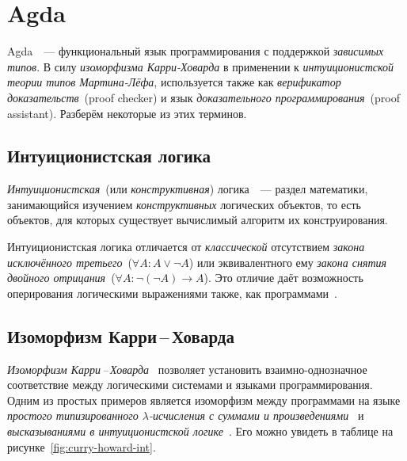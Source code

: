 \section{Agda}

Agda~\cite{agda}~--- функциональный язык программирования с поддержкой
\emph{зависимых типов}. В силу \emph{изоморфизма Карри-Ховарда} в
применении к \emph{интуиционистской теории типов Мартина-Лёфа},
используется также как \emph{верификатор доказательств}~(proof
checker) и язык \emph{доказательного программирования}~(proof assistant).
Разберём некоторые из этих терминов.

\subsection{Интуиционистская логика}

\emph{Интуиционистская}~(или \emph{конструктивная})
логика~\cite{шень2,curryhoward}~--- раздел математики, занимающийся
изучением \emph{конструктивных} логических объектов, то есть объектов,
для которых существует вычислимый алгоритм их конструирования.


Интуиционистская логика отличается от \emph{классической} отсутствием
\emph{закона исключённого третьего}~($\forall A : A \vee \neg A$) или
эквивалентного ему \emph{закона снятия двойного отрицания}~($\forall A
: \neg (\neg A) \to A$). Это отличие даёт возможность оперирования
логическими выражениями также, как программами~\cite{mltt}.

\subsection{Изоморфизм Карри\,–\,Ховарда}

\emph{Изоморфизм Карри\,--\,Ховарда}~\cite{curryhoward} позволяет
установить взаимно-однозначное соответствие между логическими
системами и языками программирования. Одним из простых примеров
является изоморфизм между программами на языке \emph{простого
  типизированного $\lambda$-исчисления с суммами и
  произведениями}~\cite{curryhoward} и \emph{высказываниями в
  интуиционистской логике}~\cite{curryhoward}. Его можно увидеть в
таблице на рисунке~\ref{fig:curry-howard-int}. 

